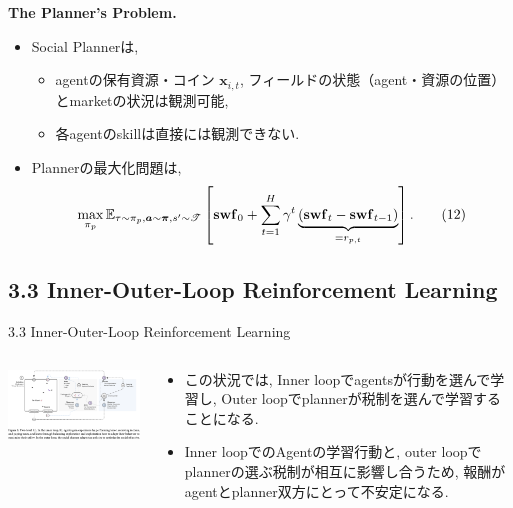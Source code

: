 \documentclass[unicode,aspectratio=169,11pt]{beamer}
\begin{document}
\begin{frame}{}{}
{\bf The Planner's Problem.}
\begin{itemize}
    \item Social Plannerは,
    \begin{itemize}
        \item agentの保有資源・コイン $\bm{x}_{i,t}$, フィールドの状態（agent・資源の位置）とmarketの状況は観測可能,
        \item 各agentのskillは直接には観測できない.
    \end{itemize}
    \item Plannerの最大化問題は,
    \[ \max_{\pi_p} \mathbb{E}_{\tau \sim \pi_p, \bm{a} \sim \bm{\pi}, s'\sim \mathscr{T}}\left[{\bf swf}_0+\sum_{t=1}^H\gamma^t\underbrace{({\bf swf}_t-{\bf swf}_{t-1})}_{=r_{p,t}}\right]. \tag{12} \]
\end{itemize}
\end{frame}

\subsection{3.3 Inner-Outer-Loop Reinforcement Learning}
\begin{frame}{3.3 Inner-Outer-Loop Reinforcement Learning}{}
    \begin{columns}[t]
        \begin{column}[]{0.6\textwidth}
            \begin{center}
                \includegraphics[width=9cm]{figure6.png}
            \end{center}
        \end{column}
        \begin{column}[]{0.4\textwidth}
            \begin{itemize}
                \item この状況では, Inner loopでagentsが行動を選んで学習し, Outer loopでplannerが税制を選んで学習することになる.
                \item Inner loopでのAgentの学習行動と, outer loopでplannerの選ぶ税制が相互に影響し合うため, 報酬がagentとplanner双方にとって不安定になる.
            \end{itemize}
        \end{column}
    \end{columns}
\end{frame}
\end{document}

